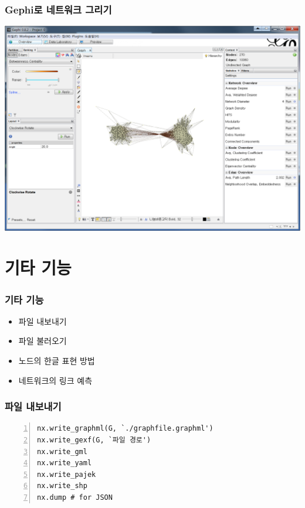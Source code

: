 \documentclass{beamer}
\begin{document}
\begin{frame}
\frametitle{Gephi로 네트워크 그리기}
\begin{center}
\includegraphics[scale=0.32]{gephi_2.png}
\end{center}
\tiny
{}
\end{frame}
\section{기타 기능}
\begin{frame}[fragile]
\frametitle{기타 기능}
\begin{itemize}
\item 파일 내보내기
\item 파일 불러오기
\item 노드의 한글 표현 방법
\item 네트워크의 링크 예측
\end{itemize}
\end{frame}

\begin{frame}[fragile]
\frametitle{파일 내보내기}
\begin{block}{}
\begin{Verbatim}[numbers=left,commandchars=\\\{\}]
nx.write_graphml(G, `./graphfile.graphml')
nx.write_gexf(G, `파일 경로')
nx.write_gml
nx.write_yaml
nx.write_pajek
nx.write_shp
nx.dump # for JSON
\end{Verbatim}
\end{block}
\end{frame}
\end{document}
